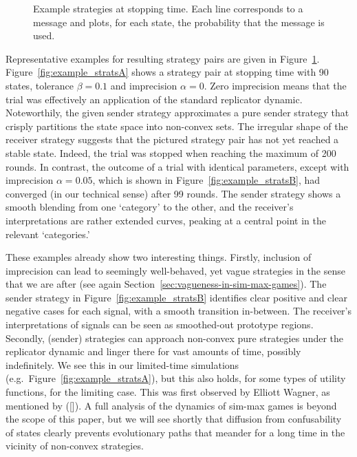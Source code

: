 \documentclass[12pt,english]{article}
\newcommand{\imprecision}{\ensuremath{\alpha}} %
\newcommand{\toler}{\ensuremath{\beta}} %
\newcommand{\ns}{\ensuremath{n_s}} %
\numberwithin{equation}{section}
\newcommand{\citetbjps}[1]{\citeauthor{#1} ([\citeyear{#1}])}
\begin{document}
\begin{figure}


  \caption{Example strategies at stopping time. Each line corresponds to a message and plots, for each state, the probability that the message is used.}
  \label{fig:example_strats}
\end{figure}

Representative examples for resulting strategy pairs are given in
Figure~\ref{fig:example_strats}. Figure~\ref{fig:example_stratsA} shows a strategy pair at
stopping time with 90 states, tolerance $\toler = 0.1$ and imprecision $\imprecision = 0$. Zero
imprecision means that the trial was effectively an application of the standard replicator dynamic. Noteworthily,
the given sender strategy approximates a pure sender strategy that crisply partitions the state
space into non-convex sets. The irregular shape of the receiver strategy suggests that the
pictured strategy pair has not yet reached a stable state. Indeed,
the trial was stopped when reaching the maximum of 200 rounds. In contrast, the outcome of a
trial with identical parameters, except with imprecision $\imprecision = 0.05$, which is shown
in Figure~\ref{fig:example_stratsB}, had converged (in our technical sense) after 99
rounds. The sender strategy shows a smooth blending from one `category' to the other, and the
receiver's interpretations are rather extended curves, peaking at a central point in the
relevant `categories.'

These examples already show two interesting things. Firstly, inclusion of imprecision can lead
to seemingly well-behaved, yet vague strategies in the sense that we are after (see again Section~\ref{sec:vagueness-in-sim-max-games}). The sender
strategy in Figure~\ref{fig:example_stratsB} identifies clear positive and clear negative cases
for each signal, with a smooth transition in-between. The receiver's interpretations of signals
can be seen as smoothed-out prototype regions. Secondly, (sender) strategies can approach
non-convex pure strategies under the replicator dynamic and linger there for vast amounts of
time, possibly indefinitely. We see this in our limited-time simulations (e.g.~Figure~\ref{fig:example_stratsA}), but this also holds, for some types of utility functions,
for the limiting case. This was first observed by Elliott Wagner, as mentioned by
\citetbjps{OConnor2014-OCOEPC}.  A full analysis of the dynamics of sim-max games is beyond the
scope of this paper, but we will see shortly that diffusion from confusability of states
clearly prevents evolutionary paths that meander for a long time in the vicinity of non-convex
strategies.
\end{document}
